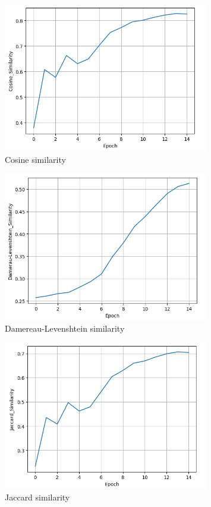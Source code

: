 \documentclass{article}
\begin{document}
\begin{figure}[H]
    \centering
    \includegraphics[width=0.8\textwidth]{../report/plots/RNN-cosine-similarity.png}
    \caption{Cosine similarity}
    \label{fig:cosine-similarity}
\end{figure}

\begin{figure}[H]
    \centering
    \includegraphics[width=0.8\textwidth]{../report/plots/RNN-dl-similarity.png}
    \caption{Damereau-Levenshtein similarity}
    \label{fig:dl-similarity}
\end{figure}

\begin{figure}[H]
    \centering
    \includegraphics[width=0.8\textwidth]{../report/plots/RNN-jaccard-similarity.png}
    \caption{Jaccard similarity}
    \label{fig:jaccard-similarity}
\end{figure}
\end{document}
